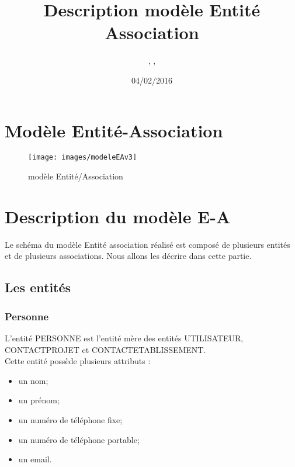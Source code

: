 \documentclass[asi, sansVersion]{picInsa}
\begin{document}
\title{Description modèle Entité Association}
\author{\Florian, \Mathieu, \Julie}
\date{04/02/2016} 

\maketitle

\tableofcontents

\chapter{Modèle Entité-Association}

\begin{landscape}
\begin{figure}
	\centering
	\texttt{[image: images/modeleEAv3]}
	\caption{\label{modele}modèle Entité/Association}
\end{figure}
\end{landscape}

\chapter{Description du modèle E-A}

Le schéma du modèle Entité association réalisé est composé de plusieurs entités et de plusieurs associations. Nous allons les décrire dans cette partie. \\ 

\section{Les entités}

\subsection*{Personne}

L'entité PERSONNE est l'entité mère des entités UTILISATEUR, CONTACTPROJET et CONTACTETABLISSEMENT. \\
Cette entité possède plusieurs attributs : 
\begin{itemize}
\item un nom; %
\item un prénom; %
\item un numéro de téléphone fixe; %
\item un numéro de téléphone portable; %
\item un email. %
\end{itemize}
\end{document}
